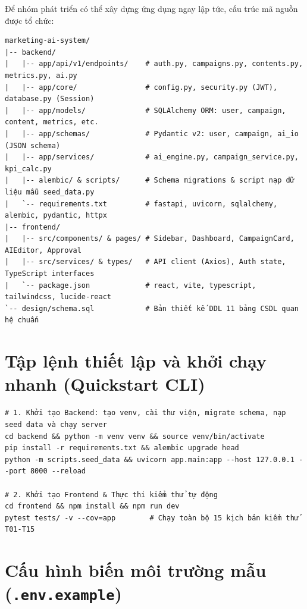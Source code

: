 Để nhóm phát triển có thể xây dựng ứng dụng ngay lập tức, cấu trúc mã nguồn được tổ chức:

\begin{footnotesize}
\begin{verbatim}
marketing-ai-system/
|-- backend/
|   |-- app/api/v1/endpoints/    # auth.py, campaigns.py, contents.py, metrics.py, ai.py
|   |-- app/core/                # config.py, security.py (JWT), database.py (Session)
|   |-- app/models/              # SQLAlchemy ORM: user, campaign, content, metrics, etc.
|   |-- app/schemas/             # Pydantic v2: user, campaign, ai_io (JSON schema)
|   |-- app/services/            # ai_engine.py, campaign_service.py, kpi_calc.py
|   |-- alembic/ & scripts/      # Schema migrations & script nạp dữ liệu mẫu seed_data.py
|   `-- requirements.txt         # fastapi, uvicorn, sqlalchemy, alembic, pydantic, httpx
|-- frontend/
|   |-- src/components/ & pages/ # Sidebar, Dashboard, CampaignCard, AIEditor, Approval
|   |-- src/services/ & types/   # API client (Axios), Auth state, TypeScript interfaces
|   `-- package.json             # react, vite, typescript, tailwindcss, lucide-react
`-- design/schema.sql            # Bản thiết kế DDL 11 bảng CSDL quan hệ chuẩn
\end{verbatim}
\end{footnotesize}

\section{Tập lệnh thiết lập và khởi chạy nhanh (Quickstart CLI)}

\begin{footnotesize}
\begin{verbatim}
# 1. Khởi tạo Backend: tạo venv, cài thư viện, migrate schema, nạp seed data và chạy server
cd backend && python -m venv venv && source venv/bin/activate
pip install -r requirements.txt && alembic upgrade head
python -m scripts.seed_data && uvicorn app.main:app --host 127.0.0.1 --port 8000 --reload

# 2. Khởi tạo Frontend & Thực thi kiểm thử tự động
cd frontend && npm install && npm run dev
pytest tests/ -v --cov=app        # Chạy toàn bộ 15 kịch bản kiểm thử T01-T15
\end{verbatim}
\end{footnotesize}

\section{Cấu hình biến môi trường mẫu (\texttt{.env.example})}

